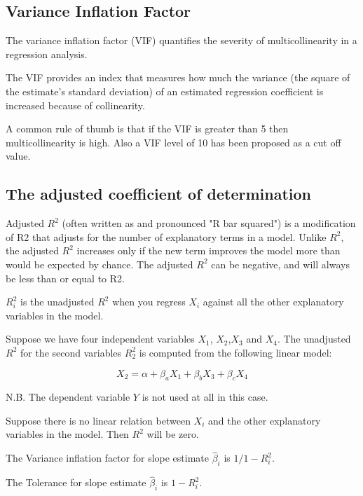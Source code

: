 \subsection{Variance Inflation Factor}

The variance inflation factor (VIF) quantifies the severity of multicollinearity in a regression analysis.

The VIF provides an index that measures how much the variance (the square of the estimate's standard deviation) of an estimated regression coefficient is increased because of collinearity.


A common rule of thumb is that if the VIF is greater than 5 then multicollinearity is high. Also a VIF level of 10 has been proposed as a cut off value.

\subsection{The adjusted coefficient of determination}
Adjusted $R^2$ (often written as  and pronounced "R bar squared") is a modification of R2 that adjusts for the number of explanatory terms in a model. Unlike $R^2$, the adjusted $R^2$ increases only if the new term improves the model more than would be expected by chance. The adjusted $R^2$ can be negative, and will always be less than or equal to R2.


$R^2_i$ is the unadjusted $R^2$ when you regress $X_i$ against all the other explanatory variables in the model.

Suppose we have four independent variables $X_1$, $X_2$,$X_3$ and $X_4$.
The unadjusted $R^2$ for the second variables $R^2_2$ is computed from the following linear model:

\[ X_2 = \alpha + \beta_a X_1 + \beta_b X_3 + \beta_c X_4 \]

N.B. The dependent variable $Y$ is not used at all in this case.


Suppose there is no linear relation between $X_i$  and the other explanatory
variables in the model. Then $R^2$ will be zero.

The Variance inflation factor for slope estimate $\hat{\beta}_i$ is $ 1 / 1 - R^2_i $.

The Tolerance for slope estimate $\hat{\beta}_i$ is $1 - R^2_i $.